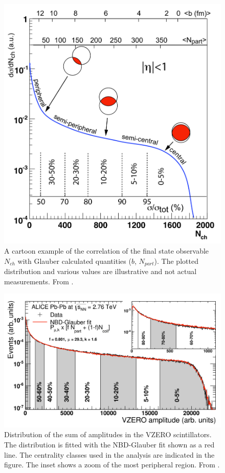 \begin{figure}[!t]
\begin{center}
\includegraphics[width=0.75\linewidth]{Chapters/Analysis/Figs/glauber-centrality.pdf}
\caption{A cartoon example of the correlation of the final state observable $N_{ch}$ with Glauber calculated quantities ($b$, $N_{part}$). The plotted distribution and various values are illustrative and not actual measurements. From \cite{Miller:2007ri}.}
\label{fig:GlauberCent}
\end{center}
\end{figure}

\begin{figure}[!t]
\begin{center}
\includegraphics[width=0.85\linewidth]{Chapters/Analysis/Figs/glauber-vzero.pdf}
\caption{Distribution of the sum of amplitudes in the VZERO scintillators. The distribution is fitted with the NBD-Glauber fit shown as a red line. The centrality classes used in the analysis are indicated in the figure. The inset shows a zoom of the most peripheral region. From \cite{Abelev:2013qoq}.}
\label{fig:GlauberVZERO}
\end{center}
\end{figure}

